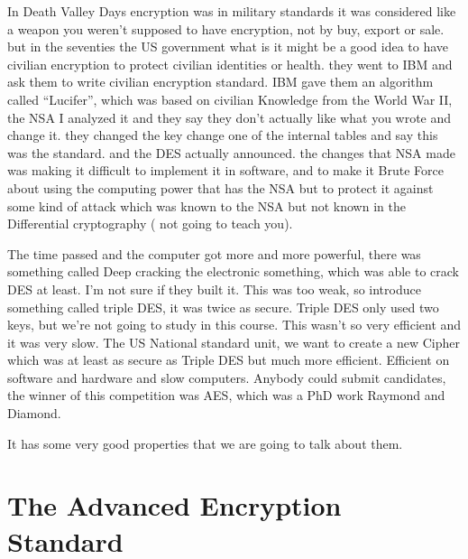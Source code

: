 In Death Valley Days encryption was in military standards it was considered like
a weapon you weren't supposed to have encryption, not by buy, export or sale.
but in the seventies the US government what is it might be a good idea to have
civilian encryption to protect civilian identities or health. they went to IBM
and ask them to write civilian encryption standard. IBM gave them an algorithm
called “Lucifer”, which was based on civilian Knowledge from the World War II,
the NSA I analyzed it and they say they don't actually like what you wrote and
change it. they changed the key change one of the internal tables and say this
was the standard. and the DES actually announced. the changes that NSA made was
making it difficult to implement it in software, and to make it Brute Force
about using the computing power that has the NSA but to protect it against some
kind of attack which was known to the NSA but not known in the Differential
cryptography ( not going to teach you).

The time passed and the computer got more and more powerful, there was something
called Deep cracking the electronic something, which was able to crack DES at
least. I'm not sure if they built it. This was too weak, so introduce something
called triple DES, it was twice as secure. Triple DES only used two keys, but
we're not going to study in this course. This wasn't so very efficient and it
was very slow. The US National standard unit, we want to create a new Cipher
which was at least as secure as Triple DES but much more efficient. Efficient on
software and hardware and slow computers. Anybody could submit candidates, the
winner of this competition was AES, which was a PhD work Raymond and Diamond.

It has some very good properties that we are going to talk about them.

\section{The Advanced Encryption Standard} 


